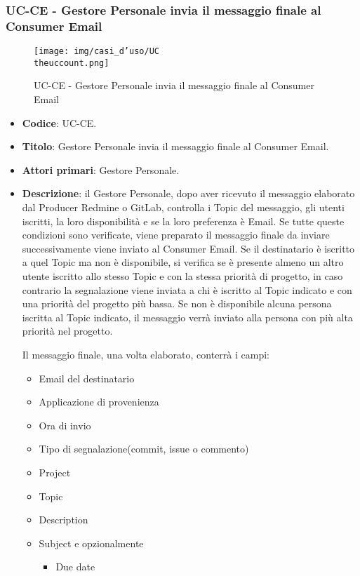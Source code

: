 \subsubsection{UC\theuccount-CE - Gestore Personale invia il messaggio finale al Consumer Email}
	\begin{figure}[H]
		\centering
		\texttt{[image: img/casi\_d'uso/UC\\theuccount.png]}\\
		\caption{UC\theuccount-CE - Gestore Personale invia il messaggio finale al Consumer Email}
	\end{figure}
	\begin{itemize}
		\item \textbf{Codice}: UC\theuccount-CE.
		\item \textbf{Titolo}: Gestore Personale invia il messaggio finale al Consumer Email.
		\item \textbf{Attori primari}: Gestore Personale.
		\item \textbf{Descrizione}: il Gestore Personale, dopo aver ricevuto il messaggio elaborato
		dal Producer Redmine o GitLab, controlla i Topic del messaggio, gli utenti iscritti, la loro disponibilità e se la loro preferenza è Email.
		Se tutte queste condizioni sono verificate, viene preparato il messaggio finale da inviare successivamente viene inviato al Consumer Email.
		Se il destinatario è iscritto a quel Topic ma non è disponibile, si verifica se è presente almeno un altro utente iscritto allo stesso Topic e con la stessa priorità di progetto, in caso contrario la segnalazione viene inviata a chi è iscritto al Topic indicato e con una priorità del progetto più bassa. Se non è disponibile alcuna persona iscritta al Topic indicato, il messaggio verrà inviato alla persona con più alta priorità nel progetto. \par
		Il messaggio finale, una volta elaborato, conterrà i campi:
		\begin{itemize}
			\item Email del destinatario
			\item Applicazione di provenienza
			\item Ora di invio
			\item Tipo di segnalazione(commit, issue o commento)
			\item Project
			\item Topic
			\item Description
			\item Subject e opzionalmente
		 	\begin{itemize}
				\item Due date

\end{itemize}
\end{itemize}
\end{itemize}
